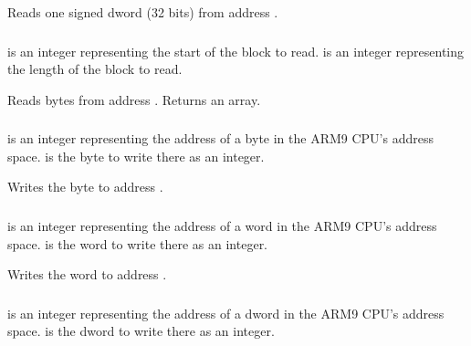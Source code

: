 \documentclass[letterpaper,10pt,english]{sphinxmanual}
\begin{document}
\sphinxAtStartPar
Reads one signed dword (32 bits) from address .


\subsubsection{}
\label{\detokenize{mods:memory-readbyterange-address-length}}\label{\detokenize{mods:readbyterange}}
\sphinxAtStartPar
{} is an integer representing the start of the block to read.  is an integer representing the length of the block to read.

\sphinxAtStartPar
Reads  bytes from address . Returns an array.


\subsubsection{}
\label{\detokenize{mods:memory-writebyte-address-value}}\label{\detokenize{mods:writebyte}}
\sphinxAtStartPar
{} is an integer representing the address of a byte in the ARM9 CPU’s address space.  is the byte to write there as an integer.

\sphinxAtStartPar
Writes the byte  to address .


\subsubsection{}
\label{\detokenize{mods:memory-writeword-address-value}}\label{\detokenize{mods:writeword}}
\sphinxAtStartPar
{} is an integer representing the address of a word in the ARM9 CPU’s address space.  is the word to write there as an integer.

\sphinxAtStartPar
Writes the word  to address .


\subsubsection{}
\label{\detokenize{mods:memory-writedword-address-value}}\label{\detokenize{mods:writedword}}
\sphinxAtStartPar
{} is an integer representing the address of a dword in the ARM9 CPU’s address space.  is the dword to write there as an integer.
\end{document}
